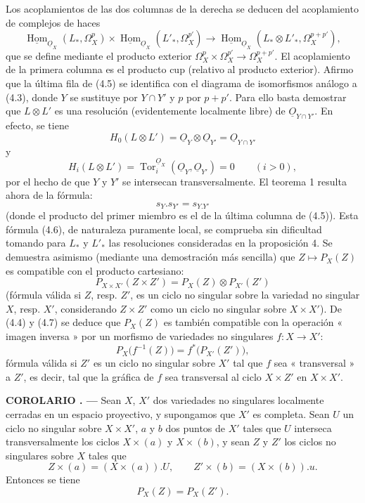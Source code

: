 \documentclass[11pt,twoside,openany]{book}
\numberwithin{equation}{section}
\newcommand{\src}[1]{%
  \phantomsection\hypertarget{src:#1}{}%
  \marginpar{\raggedleft\footnotesize\sffamily #1}%
}
\newcommand{\Osh}{\underline{O}}
\newcommand{\Homsh}{\underline{\operatorname{Hom}}}
\theoremstyle{plain}
\theoremstyle{definition}
\theoremstyle{remark}
\newcommand{\result}[2]{%
  \par\medskip\noindent\textbf{#1%
  \if\relax\detokenize{#2}\relax\else\space#2\fi. ---}\enspace
}
\newcommand{\FgaUnitKey}{frontmatter}
\renewcommand{\src}[1]{%
  \phantomsection\hypertarget{src:\FgaUnitKey:#1}{}%
  \marginpar{\raggedleft\footnotesize\sffamily #1}%
}
\theoremstyle{plain}
\theoremstyle{definition}
\theoremstyle{remark}
\begin{document}
\src{180}
Los acoplamientos de las dos columnas de la derecha se deducen del acoplamiento de
complejos de haces
\[
\Homsh_{\Osh_X}(L_{*},\Omega_X^{p})
\times\Homsh_{\Osh_X}(L'_{*},\Omega_X^{p'})
\longrightarrow
\Homsh_{\Osh_X}(L_{*}\otimes L'_{*},\Omega_X^{p+p'}),
\]
que se define mediante el producto exterior
$\Omega_X^{p}\times\Omega_X^{p'}\longrightarrow\Omega_X^{p+p'}$.
El acoplamiento de la primera columna es el producto cup (relativo al producto
exterior). Afirmo que la última fila de (4.5) se identifica con el diagrama
de isomorfismos análogo a (4.3), donde $Y$ se sustituye por $Y\cap Y'$ y $p$ por
$p+p'$. Para ello basta demostrar que $L\otimes L'$ es una resolución
(evidentemente localmente libre) de $\Osh_{Y\cap Y'}$. En efecto, se tiene
\[
  H_0(L\otimes L')=\Osh_Y\otimes\Osh_{Y'}=\Osh_{Y\cap Y'}
\]
y
\[
  H_i(L\otimes L')=\operatorname{Tor}_{i}^{\Osh_X}(\Osh_Y,\Osh_{Y'})=0
  \qquad(i>0),
\]
por el hecho de que $Y$ y $Y'$ se intersecan transversalmente. El teorema 1 resulta
ahora de la fórmula:
\begin{equation}\tag{4.6}
  s_Y.s_{Y'}=s_{Y.Y'}
\end{equation}
(donde el producto del primer miembro es el de la última columna de (4.5)).
Esta fórmula (4.6), de naturaleza puramente local, se comprueba sin dificultad
tomando para $L_{*}$ y $L'_{*}$ las resoluciones consideradas en la proposición
4. Se demuestra asimismo (mediante una demostración más sencilla) que
$Z\longmapsto P_X(Z)$ es compatible con el producto cartesiano:
\begin{equation}\tag{4.7}
  P_{X\times X'}(Z\times Z')=P_X(Z)\otimes P_{X'}(Z')
\end{equation}
(fórmula válida si $Z$, resp. $Z'$, es un ciclo no singular sobre la variedad
no singular $X$, resp. $X'$, considerando $Z\times Z'$ como un ciclo no
singular sobre $X\times X'$). De (4.4) y (4.7) se deduce que $P_X(Z)$ es también
compatible con la operación « imagen inversa » por un morfismo de variedades no
singulares $f:X\longrightarrow X'$:
\begin{equation}\tag{4.8}
  P_X\bigl(f^{-1}(Z)\bigr)=f^{*}\bigl(P_{X'}(Z')\bigr),
\end{equation}
fórmula válida si $Z'$ es un ciclo no singular sobre $X'$ tal que $f$ sea
« transversal » a $Z'$, es decir, tal que la gráfica de $f$ sea transversal al ciclo
$X\times Z'$ en $X\times X'$.

\src{181}
\result{COROLARIO}{1} Sean $X$, $X'$ dos variedades no singulares
localmente cerradas en un espacio proyectivo, y supongamos que $X'$ es completa. Sean $U$
un ciclo no singular sobre $X\times X'$, $a$ y $b$ dos puntos de $X'$ tales que
$U$ interseca transversalmente los ciclos $X\times(a)$ y $X\times(b)$, y sean $Z$
y $Z'$ los ciclos no singulares sobre $X$ tales que
\[
  Z\times(a)=(X\times(a)).U,
  \qquad
  Z'\times(b)=(X\times(b)).u.
\]
Entonces se tiene
\[
  P_X(Z)=P_X(Z').
\]
\end{document}
